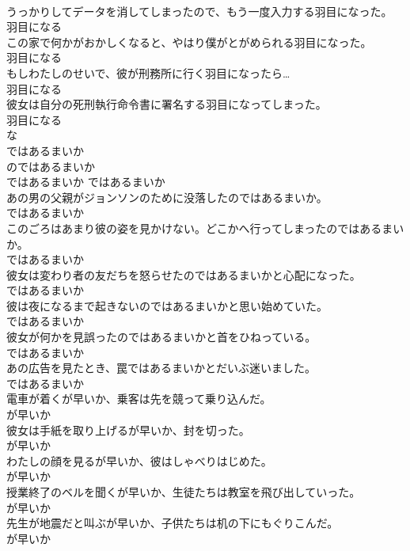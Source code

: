 \documentclass[8pt]{extreport}
\begin{document}
\begin{CJK}{UTF8}{min}
\\	うっかりしてデータを消してしまったので、もう一度入力する羽目になった。	
\\	羽目になる
\\	この家で何かがおかしくなると、やはり僕がとがめられる羽目になった。	
\\	羽目になる
\\	もしわたしのせいで、彼が刑務所に行く羽目になったら…	
\\	羽目になる
\\	彼女は自分の死刑執行命令書に署名する羽目になってしまった。	
\\	羽目になる
\\	な
\\	ではあるまいか	
\\	のではあるまいか	
\\	ではあるまいか	ではあるまいか
\\	あの男の父親がジョンソンのために没落したのではあるまいか。	
\\	ではあるまいか
\\	このごろはあまり彼の姿を見かけない。どこかへ行ってしまったのではあるまいか。	
\\	ではあるまいか
\\	彼女は変わり者の友だちを怒らせたのではあるまいかと心配になった。	
\\	ではあるまいか
\\	彼は夜になるまで起きないのではあるまいかと思い始めていた。	
\\	ではあるまいか
\\	彼女が何かを見誤ったのではあるまいかと首をひねっている。	
\\	ではあるまいか
\\	あの広告を見たとき、罠ではあるまいかとだいぶ迷いました。	
\\	ではあるまいか
\\	電車が着くが早いか、乗客は先を競って乗り込んだ。	
\\	が早いか
\\	彼女は手紙を取り上げるが早いか、封を切った。	
\\	が早いか
\\	わたしの顔を見るが早いか、彼はしゃべりはじめた。	
\\	が早いか
\\	授業終了のベルを聞くが早いか、生徒たちは教室を飛び出していった。	
\\	が早いか
\\	先生が地震だと叫ぶが早いか、子供たちは机の下にもぐりこんだ。	
\\	が早いか

\end{CJK}
\end{document}
